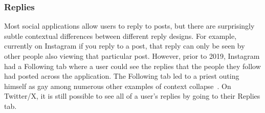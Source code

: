 








\subsubsection{Replies}

Most social applications allow users to reply to posts, but there are surprisingly subtle
contextual differences between different reply designs.
For example, currently on Instagram
if you reply to a post, that reply can only be seen by other
people also viewing that particular post.
However, prior to 2019, Instagram had a Following tab where a user could see
the replies that the people they follow had posted across the application.
The Following tab led to a priest outing himself as gay among numerous other
examples of context collapse~\cite{instagramfollowingtab}.
On Twitter/X, it is still possible to see all of a user's replies by going
to their Replies tab.


